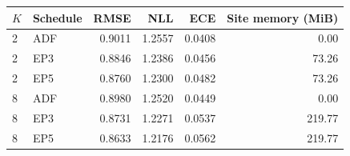 \begin{tabular}{llrrrr}
\toprule
$K$ & Schedule & RMSE & NLL & ECE & Site memory (MiB) \\
\midrule
2 & ADF & 0.9011 & 1.2557 & 0.0408 & 0.00 \\
2 & EP3 & 0.8846 & 1.2386 & 0.0456 & 73.26 \\
2 & EP5 & 0.8760 & 1.2300 & 0.0482 & 73.26 \\
8 & ADF & 0.8980 & 1.2520 & 0.0449 & 0.00 \\
8 & EP3 & 0.8731 & 1.2271 & 0.0537 & 219.77 \\
8 & EP5 & 0.8633 & 1.2176 & 0.0562 & 219.77 \\
\bottomrule
\end{tabular}
